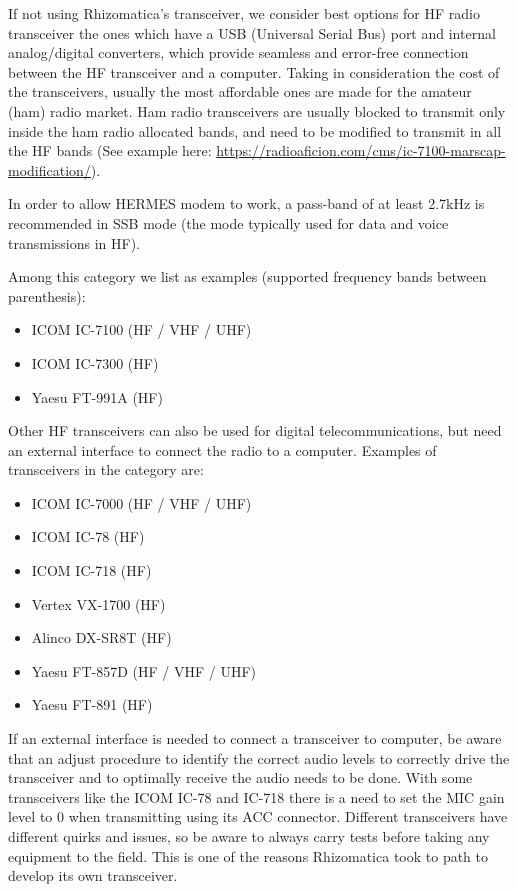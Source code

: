 \documentclass[11pt,a4paper]{article}
\begin{document}
If not using Rhizomatica's transceiver, we consider best options for HF
radio transceiver the ones which have a USB (Universal Serial Bus) port and internal
analog/digital converters, which provide seamless and error-free
connection between the HF transceiver and a computer. Taking in
consideration the cost of the transceivers, usually the most affordable ones
are made for the amateur (ham) radio market. Ham radio transceivers are
usually blocked to transmit only inside the ham radio allocated bands, and need
to be modified to transmit in all the HF bands (See example here:
\url{https://radioaficion.com/cms/ic-7100-marscap-modification/}).

In order to allow HERMES modem to work, a pass-band of at least 2.7kHz is
recommended in SSB mode (the mode typically used for data and voice
transmissions in HF).

Among this category we list as examples (supported frequency bands between parenthesis):

\begin{itemize}
\item ICOM IC-7100 (HF / VHF / UHF)
\item ICOM IC-7300 (HF)
\item Yaesu FT-991A (HF)
\end{itemize}

Other HF transceivers can also be used for digital telecommunications, but
need an external interface to connect the radio to a computer. Examples
of transceivers in the category are:

\begin{itemize}
\item ICOM IC-7000 (HF / VHF / UHF)
\item ICOM IC-78 (HF)
\item ICOM IC-718 (HF)
\item Vertex VX-1700 (HF)
\item Alinco DX-SR8T (HF)
\item Yaesu FT-857D (HF / VHF / UHF)
\item Yaesu FT-891 (HF)
\end{itemize}

If an external interface is needed to connect a transceiver to computer, be
aware that an adjust procedure to identify the correct audio levels to
correctly drive the transceiver and to optimally receive the audio needs to
be done. With some transceivers like the ICOM IC-78 and IC-718 there is a
need to set the MIC gain level to 0 when transmitting using its ACC
connector. Different transceivers have different quirks and issues, so be
aware to always carry tests before taking any equipment to the field. This
is one of the reasons Rhizomatica took to path to develop its own
transceiver.
\end{document}

